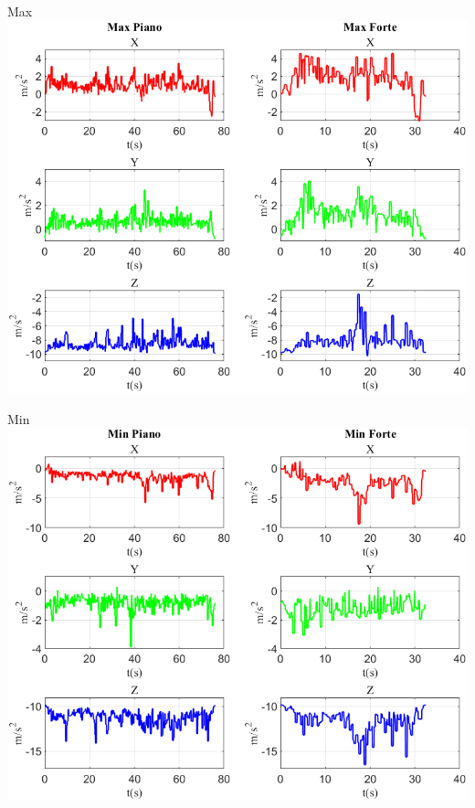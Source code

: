 \documentclass[beamer]{standalone}
\begin{document}
	\begin{frame}{{Max}}
		\centering\includegraphics[height=.8\textheight]{figure/Acc/Max}
	\end{frame}
	
	\begin{frame}{{Min}}
		\centering\includegraphics[height=.8\textheight]{figure/Acc/Min}
	\end{frame}
\end{document}
